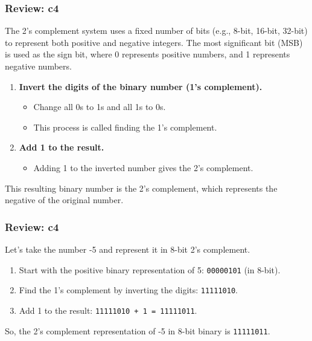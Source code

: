 \documentclass[
	11pt, %
]{beamer}
\begin{document}

\begin{frame}
	\frametitle{Review: c4}

The 2's complement system uses a fixed number of bits (e.g., 8-bit, 16-bit, 32-bit) to represent both positive and negative integers. The most significant bit (MSB) is used as the sign bit, where 0 represents positive numbers, and 1 represents negative numbers.

\begin{enumerate}
    \item \textbf{Invert the digits of the binary number (1's complement).}
    \begin{itemize}
        \item Change all 0s to 1s and all 1s to 0s.
        \item This process is called finding the 1's complement.
    \end{itemize}

    \item \textbf{Add 1 to the result.}
    \begin{itemize}
        \item Adding 1 to the inverted number gives the 2's complement.
    \end{itemize}
\end{enumerate}

This resulting binary number is the 2's complement, which represents the negative of the original number.\\


\end{frame}


\begin{frame}
	\frametitle{Review: c4}

Let’s take the number -5 and represent it in 8-bit 2's complement.

\begin{enumerate}
    \item Start with the positive binary representation of 5: \texttt{00000101} (in 8-bit).
    \item Find the 1's complement by inverting the digits: \texttt{11111010}.
    \item Add 1 to the result: \texttt{11111010 + 1 = 11111011}.
\end{enumerate}

So, the 2's complement representation of -5 in 8-bit binary is \texttt{11111011}.

\end{frame}
\end{document}
